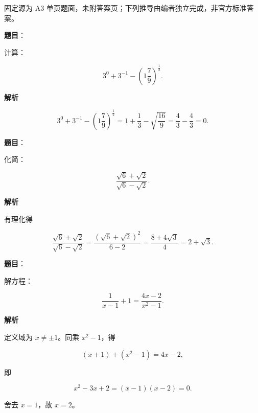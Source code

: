 

\begin{gktip}
固定源为 A3 单页题面，未附答案页；下列推导由编者独立完成，非官方标准答案。
\end{gktip}

\begin{answer}

\textbf{题目}：

计算：

\nopagebreak[4]
\[
3^0+3^{-1}-\left(1\frac79\right)^{\frac12}.
\]

\textbf{解析}

\nopagebreak[4]
\[
3^0+3^{-1}-\left(1\frac79\right)^{\frac12}
=1+\frac13-\sqrt{\frac{16}{9}}=\frac43-\frac43=0.
\]


\end{answer}
\begin{answer}

\textbf{题目}：

化简：

\nopagebreak[4]
\[
\frac{\sqrt6+\sqrt2}{\sqrt6-\sqrt2}.
\]

\textbf{解析}

有理化得

\nopagebreak[4]
\[
\frac{\sqrt6+\sqrt2}{\sqrt6-\sqrt2}
=\frac{(\sqrt6+\sqrt2)^2}{6-2}
=\frac{8+4\sqrt3}{4}=2+\sqrt3.
\]


\end{answer}
\begin{answer}

\textbf{题目}：

解方程：

\nopagebreak[4]
\[
\frac1{x-1}+1=\frac{4x-2}{x^2-1}.
\]

\textbf{解析}

定义域为 $x\ne\pm1$。同乘 $x^2-1$，得

\nopagebreak[4]
\[
(x+1)+(x^2-1)=4x-2,
\]

即

\nopagebreak[4]
\[
x^2-3x+2=(x-1)(x-2)=0.
\]

舍去 $x=1$，故 $x=2$。


\end{answer}
